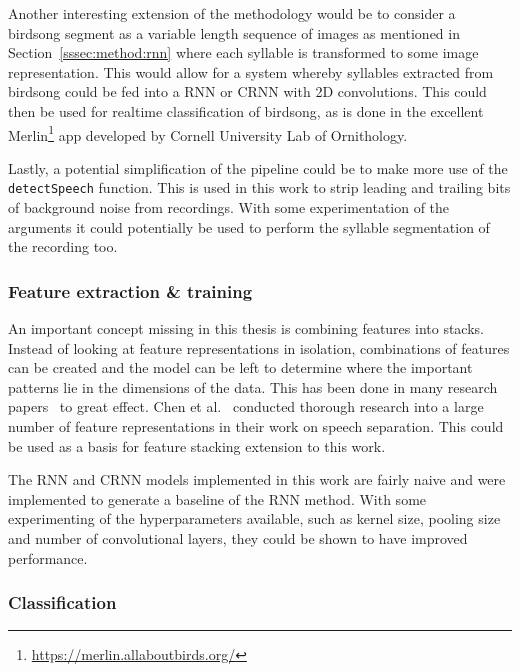 Another interesting extension of the methodology would be to consider a birdsong
segment as a variable length sequence of images as mentioned in
Section~\ref{sssec:method:rnn} where each syllable is transformed to some image
representation. This would allow for a system whereby syllables extracted from
birdsong could be fed into a RNN or CRNN with 2D convolutions. This could then
be used for realtime classification of birdsong, as is done in the excellent
Merlin\footnote{\url{https://merlin.allaboutbirds.org/}} app developed by
Cornell University Lab of Ornithology.

Lastly, a potential simplification of the pipeline could be to make more use of
the \texttt{detectSpeech} function. This is used in this work to strip leading
and trailing bits of background noise from recordings. With some experimentation
of the arguments it could potentially be used to perform the syllable
segmentation of the recording too.

\subsubsection{Feature extraction \& training}

An important concept missing in this thesis is combining features into stacks.
Instead of looking at feature representations in isolation, combinations of
features can be created and the model can be left to determine where the
important patterns lie in the dimensions of the data. This has been done in many
research papers~\cite{yan2021birdsong,ramashini2019bird,somervuo2006parametric}
to great effect. Chen et al.~\cite{chen2014feature} conducted thorough research
into a large number of feature representations in their work on speech
separation. This could be used as a basis for feature stacking extension to this
work.

The RNN and CRNN models implemented in this work are fairly naive and were
implemented to generate a baseline of the RNN method. With some experimenting of
the hyperparameters available, such as kernel size, pooling size and number of
convolutional layers, they could be shown to have improved performance.

\subsubsection{Classification}


